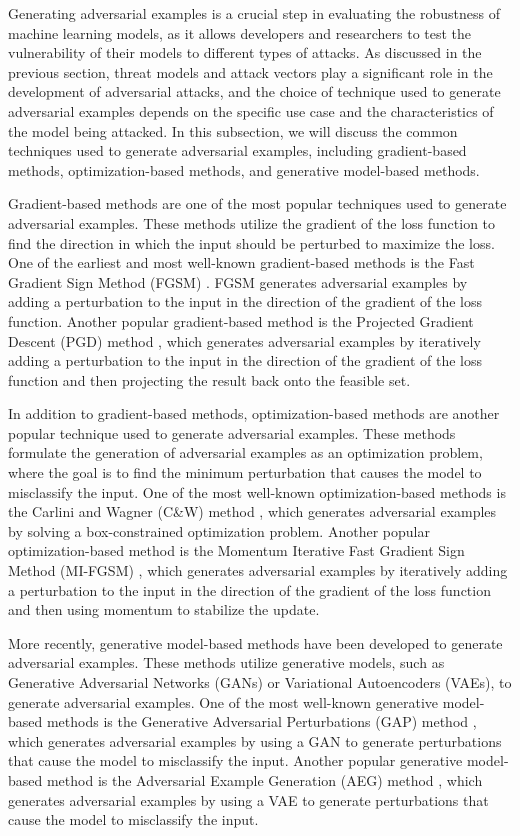 \documentclass[11pt]{article}
\begin{document}
Generating adversarial examples is a crucial step in evaluating the robustness of machine learning models, as it allows developers and researchers to test the vulnerability of their models to different types of attacks. As discussed in the previous section, threat models and attack vectors play a significant role in the development of adversarial attacks, and the choice of technique used to generate adversarial examples depends on the specific use case and the characteristics of the model being attacked. In this subsection, we will discuss the common techniques used to generate adversarial examples, including gradient-based methods, optimization-based methods, and generative model-based methods.

Gradient-based methods are one of the most popular techniques used to generate adversarial examples. These methods utilize the gradient of the loss function to find the direction in which the input should be perturbed to maximize the loss. One of the earliest and most well-known gradient-based methods is the Fast Gradient Sign Method (FGSM) \cite{ref53}. FGSM generates adversarial examples by adding a perturbation to the input in the direction of the gradient of the loss function. Another popular gradient-based method is the Projected Gradient Descent (PGD) method \cite{ref54}, which generates adversarial examples by iteratively adding a perturbation to the input in the direction of the gradient of the loss function and then projecting the result back onto the feasible set.

In addition to gradient-based methods, optimization-based methods are another popular technique used to generate adversarial examples. These methods formulate the generation of adversarial examples as an optimization problem, where the goal is to find the minimum perturbation that causes the model to misclassify the input. One of the most well-known optimization-based methods is the Carlini and Wagner (C\&W) method \cite{ref55}, which generates adversarial examples by solving a box-constrained optimization problem. Another popular optimization-based method is the Momentum Iterative Fast Gradient Sign Method (MI-FGSM) \cite{ref56}, which generates adversarial examples by iteratively adding a perturbation to the input in the direction of the gradient of the loss function and then using momentum to stabilize the update.

More recently, generative model-based methods have been developed to generate adversarial examples. These methods utilize generative models, such as Generative Adversarial Networks (GANs) or Variational Autoencoders (VAEs), to generate adversarial examples. One of the most well-known generative model-based methods is the Generative Adversarial Perturbations (GAP) method \cite{ref57}, which generates adversarial examples by using a GAN to generate perturbations that cause the model to misclassify the input. Another popular generative model-based method is the Adversarial Example Generation (AEG) method \cite{ref58}, which generates adversarial examples by using a VAE to generate perturbations that cause the model to misclassify the input.
\end{document}
